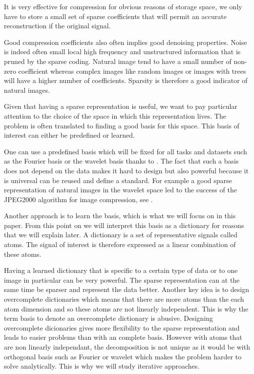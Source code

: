 \documentclass[a4paper,11pt]{article}
\begin{document}
It is very effective for compression for obvious reasons of storage space, we only have to store a small set of sparse coefficients that will permit an accurate reconstruction if the original signal.

Good compression coefficients also often implies good denoising properties.
Noise is indeed often small local high frequency and unstructured information that is pruned by the sparse coding.
Natural image tend to have a small number of non-zero coefficient whereas complex images like random images or images with trees will have a higher number of coefficients.
Sparsity is therefore a good indicator of natural images.

Given that having a sparse representation is useful, we want to pay particular attention to the choice of the space in which this representation lives.
The problem is often translated to finding a good basis for this space.
This basis of interest can either be predefined or learned.

One can use a predefined basis which will be fixed for all tasks and datasets such as the Fourier basis or the wavelet basis thanks to \cite{mallat99}.
The fact that such a basis does not depend on the data makes it hard to design but also powerful because it is universal can be reused and define a standard.
For example a good sparse representation of natural images in the wavelet space led to the success of the JPEG2000 algorithm for image compression, see \cite{marcellin00}.

Another approach is to learn the basis, which is what we will focus on in this paper.
From this point on we will interpret this basis as a dictionary for reasons that we will explain later.
A dictionary is a set of representative signals called atoms.
The signal of interest is therefore expressed as a linear combination of these atoms.

Having a learned dictionary that is specific to a certain type of data or to one image in particular can be very powerful.
The sparse representation can at the same time be sparser and represent the data better.
Another key idea is to design overcomplete dictionaries which means that there are more atoms than the each atom dimension and so these atoms are not linearly independent.
This is why the term basis to denote an overcomplete dictionary is abusive.
Designing overcomplete dicionaries gives more flexibility to the sparse representation and leads to easier problems than with an complete basis.
However with atoms that are non linearly independant, the decomposition is not unique as it would be with orthogonal basis such as Fourier or wavelet which makes the problem harder to solve analytically.
This is why we will study iterative approaches.
\end{document}
